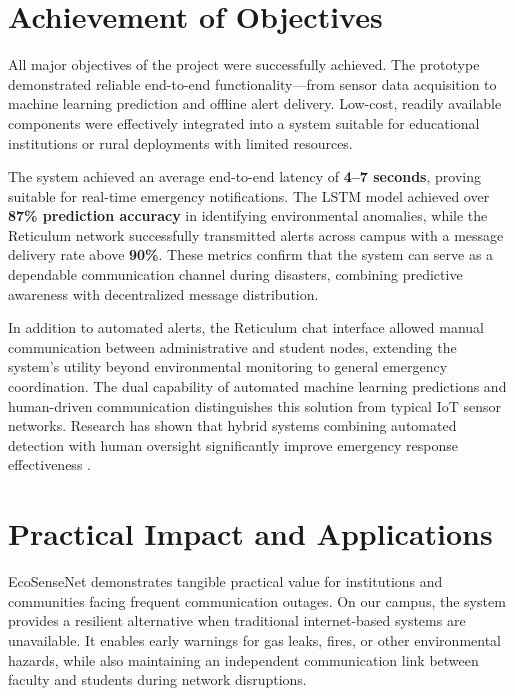 \section{Achievement of Objectives}
All major objectives of the project were successfully achieved. The prototype demonstrated reliable end-to-end functionality—from sensor data acquisition to machine learning prediction and offline alert delivery. Low-cost, readily available components were effectively integrated into a system suitable for educational institutions or rural deployments with limited resources.

The system achieved an average end-to-end latency of \textbf{4–7 seconds}, proving suitable for real-time emergency notifications. The LSTM model achieved over \textbf{87\% prediction accuracy} in identifying environmental anomalies, while the Reticulum network successfully transmitted alerts across campus with a message delivery rate above \textbf{90\%}. These metrics confirm that the system can serve as a dependable communication channel during disasters, combining predictive awareness with decentralized message distribution.

In addition to automated alerts, the Reticulum chat interface allowed manual communication between administrative and student nodes, extending the system's utility beyond environmental monitoring to general emergency coordination. The dual capability of automated machine learning predictions and human-driven communication distinguishes this solution from typical IoT sensor networks. Research has shown that hybrid systems combining automated detection with human oversight significantly improve emergency response effectiveness \cite{sharma2018iot}.

\section{Practical Impact and Applications}
EcoSenseNet demonstrates tangible practical value for institutions and communities facing frequent communication outages. On our campus, the system provides a resilient alternative when traditional internet-based systems are unavailable. It enables early warnings for gas leaks, fires, or other environmental hazards, while also maintaining an independent communication link between faculty and students during network disruptions.

